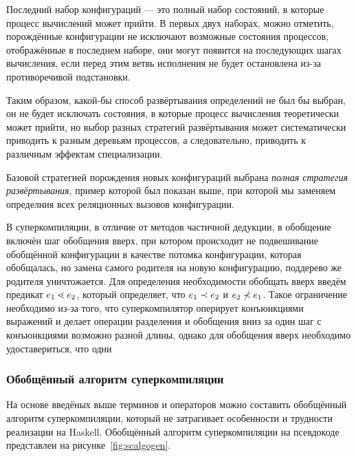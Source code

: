 Последний набор конфигураций --- это полный набор состояний, в которые процесс вычислений может
прийти. В первых двух наборах, можно отметить, порождённые конфигурации не исключают
возможные состояния процессов, отображённые в последнем наборе, они могут появится на последующих шагах вычисления,
если перед этим ветвь исполнения не будет остановлена из-за противоречивой подстановки.

Таким образом, какой-бы способ развёртывания определений не был бы выбран, он не будет
исключать состояния, в которые процесс вычисления теоретически может прийти, но выбор
разных стратегий развёртывания может систематически приводить к разным деревьям процессов,
а следовательно, приводить к различным эффектам специализации.

Базовой стратегией порождения новых конфигураций выбрана \emph{полная стратегия развёртывания},
пример которой был показан выше, при которой мы заменяем определния всех реляционных вызовов
конфигурации.

В суперкомпиляции, в отличие от методов частичной дедукции, в обобщение включён
шаг обобщения вверх, при котором происходит не подвешивание обобщённой конфигурации
в качестве потомка конфигурации, которая обобщалась, но замена самого родителя на
новую конфигурацию, поддерево же родителя уничтожается. Для определения
необходимости обобщать вверх введём предикат $e_1 \lessdot e_2$, который
определяет, что $e_1 \prec e_2$ и $e_2 \not\prec e_1$.
Такое ограничение необходимо из-за того, что суперкомпилятор оперирует
конъюнкциями выражений и делает операции разделения и обобщения вниз
за один шаг с конъюнкциями возможно разной длины, однако для обобщения
вверх необходимо удоставериться, что одни 



\subsubsection{Обобщённый алгоритм суперкомпиляции}

На основе введёных выше терминов и операторов можно составить обобщённый алгоритм
суперкомпиляции, который не затрагивает особенности и трудности реализации на Haskell.
Обобщённый алгоритм суперкомпиляции на псевдокоде представлен на рисунке~\ref{fig:scalgogen}.

